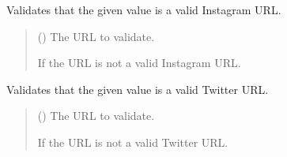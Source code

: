 \documentclass[letterpaper,10pt,english]{sphinxmanual}
\begin{document}
\label{\detokenize{modules/others:module-account.validators}}

\begin{fulllineitems}
\label{\detokenize{modules/others:account.validators.validate_instagram_url}}
\pysigstartsignatures
{}
\pysigstopsignatures
\sphinxAtStartPar
Validates that the given value is a valid Instagram URL.
\begin{quote}\begin{description}
\sphinxAtStartPar
{} () \textendash{} The URL to validate.

\sphinxAtStartPar
{} \textendash{} If the URL is not a valid Instagram URL.

\end{description}\end{quote}

\end{fulllineitems}


\begin{fulllineitems}
\label{\detokenize{modules/others:account.validators.validate_twitter_url}}
\pysigstartsignatures
{}
\pysigstopsignatures
\sphinxAtStartPar
Validates that the given value is a valid Twitter URL.
\begin{quote}\begin{description}
\sphinxAtStartPar
{} () \textendash{} The URL to validate.

\sphinxAtStartPar
{} \textendash{} If the URL is not a valid Twitter URL.

\end{description}\end{quote}

\end{fulllineitems}
\end{document}
